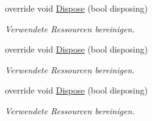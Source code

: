 \begin{DoxyCompactItemize}
override void \hyperlink{class_assessment___two_1_1_main_window_a3be02bf3666f0498bba373d5686bba31}{Dispose} (bool disposing)
\begin{DoxyCompactList}\small\item\em Verwendete Ressourcen bereinigen. \item\end{DoxyCompactList}\item 
override void \hyperlink{class_assessment___two_1_1_main_window_a3be02bf3666f0498bba373d5686bba31}{Dispose} (bool disposing)
\begin{DoxyCompactList}\small\item\em Verwendete Ressourcen bereinigen. \item\end{DoxyCompactList}\item 
override void \hyperlink{class_assessment___two_1_1_main_window_a3be02bf3666f0498bba373d5686bba31}{Dispose} (bool disposing)
\begin{DoxyCompactList}\small\item\em Verwendete Ressourcen bereinigen. \item\end{DoxyCompactList}\end{DoxyCompactItemize}
